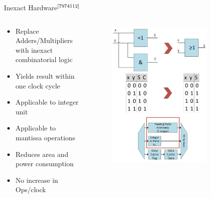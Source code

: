 \documentclass{beamer}
\begin{document}
\begin{frame}{Inexact Hardware$^{\text{\cite{7974112}}}$}
\begin {columns}
 \begin{column}{0.5\textwidth}
 
    \begin{itemize}
        \item<1->Replace Adders/Multipliers with inexact combinatorial logic
        \item<2->Yields result within one clock cycle
        \item<3->Applicable to integer unit 
        \item<4->Applicable to mantissa operations
        \item<5->Reduces area and power consumption
        \item<6->No increase in Ops/clock
    \end{itemize}
    
 \end{column}
  \begin{column}{0.5\textwidth}
    \begin{figure}
     \includegraphics[width=0.8\textwidth]{img/inaccurateHardware.jpg}
    \end{figure}
  \end{column}
\end {columns}
\end{frame}
\end{document}
